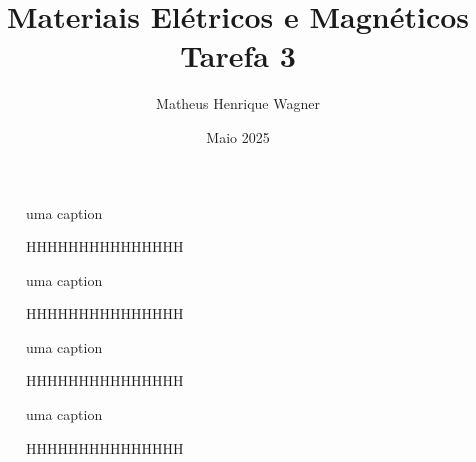 \documentclass{homeworg}
\title{Materiais Elétricos e Magnéticos\\Tarefa 3}
\author{Matheus Henrique Wagner}
\date{Maio 2025}
\begin{document}
\maketitle

\begin{figure}[!h]
  \begin{minipage}{.49\linewidth}
    \centering
    
    \vspace{-1cm}
    \caption{uma caption}
  \end{minipage}%
  \begin{minipage}{.49\linewidth}
    \centering
    
    \vspace{-1cm}
    \caption{HHHHHHHHHHHHHHH}
  \end{minipage}
  \begin{minipage}{.49\linewidth}
    \centering
    
    \vspace{-1cm}
    \caption{uma caption}
  \end{minipage}%
  \begin{minipage}{.49\linewidth}
    \centering
    
    \vspace{-1cm}
    \caption{HHHHHHHHHHHHHHH}
  \end{minipage}%
\end{figure}

\newpage

\begin{figure}[!h]
  \begin{minipage}{.49\linewidth}
    \centering
    
    \vspace{-1cm}
    \caption{uma caption}
  \end{minipage}%
  \begin{minipage}{.49\linewidth}
    \centering
    
    \vspace{-1cm}
    \caption{HHHHHHHHHHHHHHH}
  \end{minipage}
  \begin{minipage}{.49\linewidth}
    \centering
    
    \vspace{-1cm}
    \caption{uma caption}
  \end{minipage}%
  \begin{minipage}{.49\linewidth}
    \centering
    
    \vspace{-1cm}
    \caption{HHHHHHHHHHHHHHH}
  \end{minipage}%
\end{figure}
\end{document}
